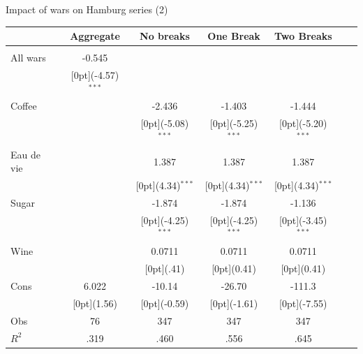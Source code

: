 \documentclass[11pt]{beamer}
\begin{document}
\begin{frame}{Impact of wars on Hamburg series (2)}
\begin{tabular*}{\textwidth}{@{\extracolsep{\fill}}lcccccc}						
	& \multicolumn{1}{c}{Aggregate} &	\multicolumn{1}{c}{No breaks} &	\multicolumn{1}{c}{One Break} & \multicolumn{1}{c}{Two Breaks} & \\
\hline					
\hline \\		
All wars &	-0.545 &	 & & & & \\
&	\raisebox{.7ex}[0pt]{\scriptsize (-4.57)$^{***}$} 	& &	& &	& \\				
Coffee &	 & -2.436 & -1.403 &	-1.444  &\\
& &	\raisebox{.7ex}[0pt]{\scriptsize (-5.08)$^{***}$} &	\raisebox{.7ex}[0pt]{\scriptsize (-5.25)$^{***}$} &	\raisebox{.7ex}[0pt]{\scriptsize (-5.20)$^{***}$} &\\
Eau de vie  & &	1.387 &1.387 &	1.387  &\\
& &	\raisebox{.7ex}[0pt]{\scriptsize (4.34)$^{***}$} &	\raisebox{.7ex}[0pt]{\scriptsize (4.34)$^{***}$} &	\raisebox{.7ex}[0pt]{\scriptsize (4.34)$^{***}$} \\
Sugar	& &	-1.874 &-1.874 &	-1.136  \\
& &	\raisebox{.7ex}[0pt]{\scriptsize (-4.25)$^{***}$} &	\raisebox{.7ex}[0pt]{\scriptsize (-4.25)$^{***}$} &	\raisebox{.7ex}[0pt]{\scriptsize (-3.45)$^{***}$} \\
Wine&	 &	0.0711 & 0.0711 &	0.0711 \\
& &	\raisebox{.7ex}[0pt]{\scriptsize (.41)} &	\raisebox{.7ex}[0pt]{\scriptsize (0.41)} &	\raisebox{.7ex}[0pt]{\scriptsize (0.41)} \\
Cons &	6.022 &	-10.14 &	-26.70  &	-111.3 \\
&	\raisebox{.7ex}[0pt]{\scriptsize (1.56)} &	\raisebox{.7ex}[0pt]{\scriptsize (-0.59)} &	\raisebox{.7ex}[0pt]{\scriptsize (-1.61)} &	\raisebox{.7ex}[0pt]{\scriptsize (-7.55)} \\
\hline 
Obs &	76 &	347 &	347  & 347 \\
$ R^2$ &	.319 &	.460 &	.556  & .645 \\

\hline\hline						
\end{tabular*}%
\end{frame}

%
\end{document}
